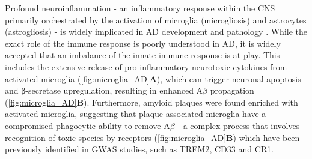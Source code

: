 \newpage
{}
Profound neuroinflammation - an inflammatory response within the CNS primarily orchestrated by the activation of microglia (microgliosis) and astrocytes (astrogliosis) - is widely implicated in AD development and pathology \cite{Cisbani2021,Griciuc2021}. While the exact role of the immune response is poorly understood in AD, it is widely accepted that an imbalance of the innate immune response is at play. This includes the extensive release of pro-inflammatory neurotoxic cytokines from activated microglia\cite{Frost2019} (\cref{fig:microglia_AD}\textbf{A}), which can trigger neuronal apoptosis\cite{Qin2002,Wang2015b} and β-secretase upregulation\cite{Chen2012}, resulting in enhanced A$\beta$ propagation (\cref{fig:microglia_AD}\textbf{B}). Furthermore, amyloid plaques were found enriched with activated microglia\cite{PL1987}, suggesting that plaque-associated microglia have a compromised phagocytic ability to remove A$\beta$\cite{Mawuenyega2010} - a complex process that involves recognition of toxic species by receptors (\cref{fig:microglia_AD}\textbf{B}) which have been previously identified in GWAS studies, such as TREM2, CD33 and CR1. 

